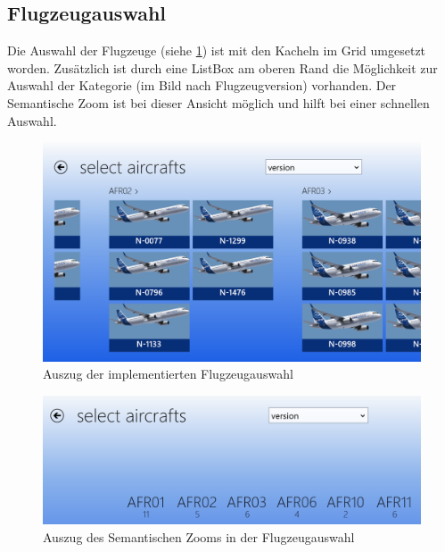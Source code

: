 \subsection{Flugzeugauswahl}
Die Auswahl der Flugzeuge (siehe \ref{aircraftSelectionImpl}) ist mit den Kacheln im Grid umgesetzt worden. Zusätzlich ist durch eine ListBox am oberen Rand die Möglichkeit zur Auswahl der Kategorie (im Bild nach Flugzeugversion) vorhanden. Der Semantische Zoom ist bei dieser Ansicht möglich und hilft bei einer schnellen Auswahl.  
\begin{figure}[H]
\centering
\includegraphics[width=\hsize]{images/impl/select_aircrafts_impl}
\caption{Auszug der implementierten Flugzeugauswahl}
\label{aircraftSelectionImpl}
\end{figure}
\begin{figure}[H]
\centering
\includegraphics[width=\hsize]{images/impl/semantic_zoom_impl}
\caption{Auszug des Semantischen Zooms in der Flugzeugauswahl}
\label{aircraftSelectionZoomImpl}
\end{figure}

